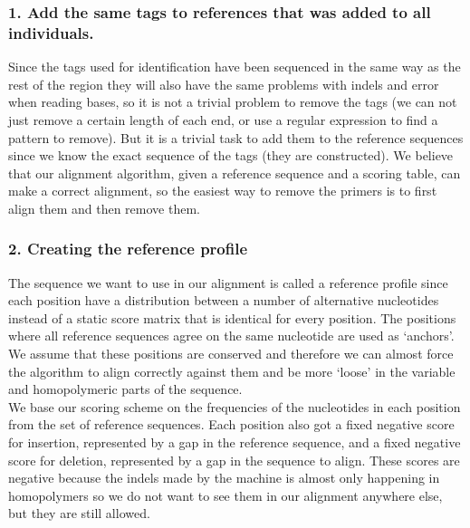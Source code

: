 
\subsubsection{1. Add the same tags to references that was added to all individuals.}

Since the tags used for identification have been sequenced in the same way as the rest of the region they will also have the same problems with indels and error when reading bases, so it is not a trivial problem to remove the tags (we can not just remove a certain length of each end, or use a regular expression to find a pattern to remove). But it is a trivial task to add them to the reference sequences since we know the exact sequence of the tags (they are constructed). We believe that our alignment algorithm, given a reference sequence and a scoring table, can make a correct alignment, so the easiest way to remove the primers is to first align them and then remove them.

\subsubsection{2. Creating the reference profile}

The sequence we want to use in our alignment is called a reference profile since each position have a distribution between a number of alternative nucleotides instead of a static score matrix that is identical for every position. The positions where all reference sequences agree on the same nucleotide are used as `anchors'. We assume that these positions are conserved and therefore we can almost force the algorithm to align correctly against them and be more `loose' in the variable and homopolymeric parts of the sequence.\\

We base our scoring scheme on the frequencies of the nucleotides in each position from the set of reference sequences. Each position also got a fixed negative score for insertion, represented by a gap in the reference sequence, and a fixed negative score for deletion, represented by a gap in the sequence to align. These scores are negative because the indels made by the machine is almost only happening in homopolymers so we do not want to see them in our alignment anywhere else, but they are still allowed.\\


